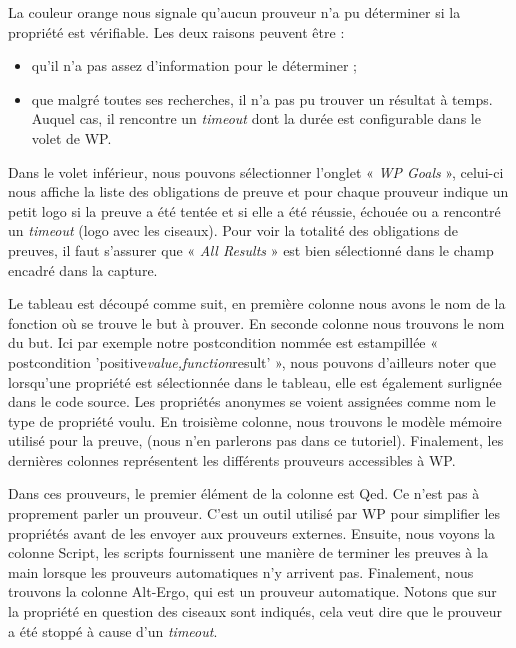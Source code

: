 La couleur orange nous signale qu'aucun prouveur n'a pu déterminer si la 
propriété est vérifiable. Les deux raisons peuvent être :



\begin{itemize}
\item qu'il n'a pas assez d'information pour le déterminer ;
\item que malgré toutes ses recherches, il n'a pas pu trouver un résultat à 
temps. Auquel cas, il rencontre un \textit{timeout} dont la durée est configurable 
dans le volet de WP.
\end{itemize}


Dans le volet inférieur, nous pouvons sélectionner l'onglet « \textit{WP Goals} », 
celui-ci nous affiche la liste des obligations de preuve et pour chaque 
prouveur indique un petit logo si la preuve a été tentée et si elle a été 
réussie, échouée ou a rencontré un \textit{timeout} (logo avec les ciseaux).
Pour voir la totalité des obligations de preuves, il
faut s'assurer que « \textit{All Results} » est bien sélectionné dans le champ encadré
dans la capture.





Le tableau est découpé comme suit, en première colonne nous avons le nom de la
fonction où se trouve le but à prouver. En seconde colonne nous trouvons le nom
du but. Ici par exemple notre postcondition nommée est estampillée 
« postcondition 'positive\textit{value,function}result' », nous pouvons d'ailleurs noter
que lorsqu'une propriété est sélectionnée dans le tableau, elle est également 
surlignée dans le code source. Les propriétés anonymes se voient assignées
comme nom le type de propriété voulu. En troisième colonne, nous trouvons le 
modèle mémoire utilisé pour la preuve, (nous n'en parlerons pas dans ce 
tutoriel). Finalement, les dernières colonnes représentent les différents 
prouveurs accessibles à WP.



Dans ces prouveurs, le premier élément de la colonne est Qed. Ce n'est pas
à proprement parler un prouveur. C'est un outil utilisé par WP pour simplifier
les propriétés avant de les envoyer aux prouveurs externes. Ensuite, nous
voyons la colonne Script, les scripts fournissent une manière de terminer
les preuves à la main lorsque les prouveurs automatiques n'y arrivent pas.
Finalement, nous trouvons la colonne Alt-Ergo, qui est un prouveur automatique.
Notons que sur la propriété en question des ciseaux sont indiqués, cela
veut dire que le prouveur a été stoppé à cause d'un \textit{timeout}.


